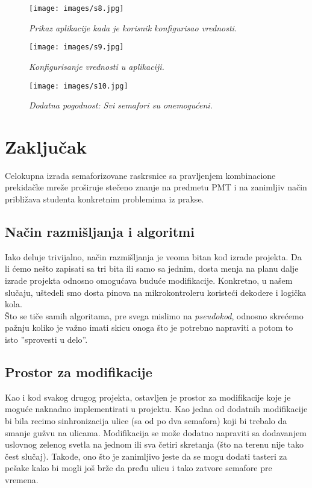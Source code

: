 \documentclass[a4paper,12pt, projekat]{etf}
\begin{document}
\begin{figure}[htb]
\centering
\texttt{[image: images/s8.jpg]}
\caption{\emph{Prikaz aplikacije kada je korisnik konfigurisao vrednosti.}}
\label{fig:im8}
\end{figure}

\begin{figure}[htb]
\centering
\texttt{[image: images/s9.jpg]}
\caption{\emph{Konfigurisanje vrednosti u aplikaciji.}}
\label{fig:im9}
\end{figure}

\begin{figure}[htb]
\centering
\texttt{[image: images/s10.jpg]}
\caption{\emph{Dodatna pogodnost: Svi semafori su onemogućeni.}}
\label{fig:im9}
\end{figure}

\chapter{Zaključak}
Celokupna izrada semaforizovane raskrsnice sa pravljenjem kombinacione prekidačke mreže proširuje stečeno znanje na predmetu PMT i na zanimljiv način približava studenta konkretnim problemima iz prakse.

\section{Način razmišljanja i algoritmi}
Iako deluje trivijalno, način razmišljanja je veoma bitan kod izrade projekta. Da li ćemo nešto zapisati sa tri bita ili samo sa jednim, dosta menja na planu dalje izrade projekta odnosno omogućava buduće modifikacije. Konkretno, u našem slučaju, uštedeli smo dosta pinova na mikrokontroleru koristeći dekodere i logička kola.\\
Što se tiče samih algoritama, pre svega mislimo na \textit{pseudokod}, odnosno skrećemo pažnju koliko je važno imati skicu onoga što je potrebno napraviti a potom to isto ''sprovesti u delo''.

\section{Prostor za modifikacije}
Kao i kod svakog drugog projekta, ostavljen je prostor za modifikacije koje je moguće naknadno implementirati u projektu. Kao jedna od dodatnih modifikacije bi bila recimo sinhronizacija ulice (sa od po dva semafora) koji bi trebalo da smanje gužvu na ulicama. Modifikacija se može dodatno napraviti sa dodavanjem uslovnog zelenog svetla na jednom ili sva četiri skretanja (što na terenu nije tako čest slučaj). Takođe, ono što je zanimljivo jeste da se mogu dodati tasteri za pešake kako bi mogli još brže da pređu ulicu i tako zatvore semafore pre vremena.
    
\end{document}

